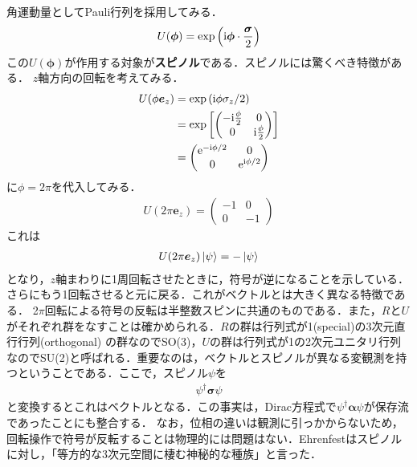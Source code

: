 \documentclass{report}
\begin{document}
角運動量としてPauli行列を採用してみる．
\begin{align}
  U(\bm{\phi}) = \exp\qty(\mathrm{i}\bm{\phi}\cdot\frac{\bm{\sigma}}{2})
\end{align}
この$U(\bm{\phi})$が作用する対象が\textbf{スピノル}である．スピノルには驚くべき特徴がある．
$z$軸方向の回転を考えてみる．
\begin{align}
  U(\phi\bm{e}_z) &= \exp\qty(\mathrm{i}\phi\sigma_z /2)\\
  &= \exp\qty[
    \begin{pmatrix}
      -\mathrm{i}\frac{\phi}{2} & 0\\
      0 & \mathrm{i}\frac{\phi}{2}
    \end{pmatrix}
  ]\\
  &=
  \begin{pmatrix}
    \mathrm{e}^{-\mathrm{i}\phi/2} & 0\\
    0 & \mathrm{e}^{\mathrm{i}\phi/2}
  \end{pmatrix}
\end{align}
に$\phi = 2\pi$を代入してみる．
\begin{align}
  U(2\pi\bm{e}_z) =
  \begin{pmatrix}
    -1 & 0\\
    0 & -1
  \end{pmatrix}
\end{align}
これは
\begin{align}
  U(2\pi\bm{e}_z)\ket{\psi} = -\ket{\psi}
\end{align}
となり，$z$軸まわりに1周回転させたときに，符号が逆になることを示している．さらにもう1回転させると元に戻る．これがベクトルとは大きく異なる特徴である．
2$\pi$回転による符号の反転は半整数スピンに共通のものである．また，$R$と$U$がそれぞれ群をなすことは確かめられる．$R$の群は行列式が1(special)の3次元直行行列(orthogonal)
の群なのでSO(3)，$U$の群は行列式が1の2次元ユニタリ行列なのでSU(2)と呼ばれる．重要なのは，ベクトルとスピノルが異なる変観測を持つということである．ここで，スピノル$\psi$を
\begin{align}
  \psi^{\dagger}\bm{\sigma}\psi
\end{align}
と変換するとこれはベクトルとなる．この事実は，Dirac方程式で$\psi^{\dagger}\bm{\alpha}\psi$が保存流であったことにも整合する．
なお，位相の違いは観測に引っかからないため，回転操作で符号が反転することは物理的には問題はない．Ehrenfestはスピノルに対し，「等方的な3次元空間に棲む神秘的な種族」と言った．
\end{document}
